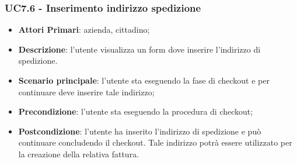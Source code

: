 \subsubsection{UC7.6 - Inserimento indirizzo spedizione}
\begin{itemize}
	\item \textbf{Attori Primari}: azienda, cittadino;
	\item \textbf{Descrizione}:
	l'utente visualizza un form dove inserire l'indirizzo di spedizione.
	\item \textbf{Scenario principale}: l'utente sta eseguendo la fase di checkout e per continuare deve inserire tale indirizzo;
	\item \textbf{Precondizione}: l'utente sta eseguendo la procedura di checkout;
	\item \textbf{Postcondizione}:
	l'utente ha inserito l'indirizzo di spedizione e può continuare concludendo il checkout. Tale indirizzo potrà essere utilizzato per la creazione della relativa fattura.
\end{itemize}